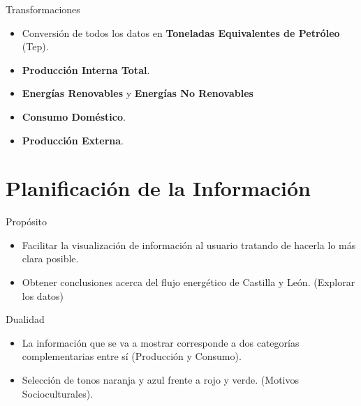 \documentclass{beamer}
\begin{document}
		\begin{frame}{Transformaciones}
		
			\begin{itemize}

				\item Conversión de todos los datos en {\bf Toneladas Equivalentes de Petróleo} (Tep).
				
				\item {\bf Producción Interna Total}.
				
				\item {\bf Energías Renovables} y {\bf Energías No Renovables}
				
				\item {\bf Consumo Doméstico}.
				
				\item {\bf Producción Externa}.
				
			\end{itemize}

		\end{frame}
		
	\section{Planificación de la Información}

		\begin{frame}{Propósito}
		
			\begin{itemize}
				\item Facilitar la visualización de información al usuario tratando de hacerla lo más clara posible.
			
				\item Obtener conclusiones acerca del flujo energético de Castilla y León. (Explorar los datos)
			
			\end{itemize}
		
		\end{frame}
		
		\begin{frame}{Dualidad}
		
			\begin{itemize}
				\item La información que se va a mostrar corresponde a dos categorías complementarias entre sí (Producción y Consumo).
							
				\item Selección de tonos naranja y azul frente a rojo y verde. (Motivos Socioculturales).
			
			\end{itemize}
		
		\end{frame}
\end{document}
